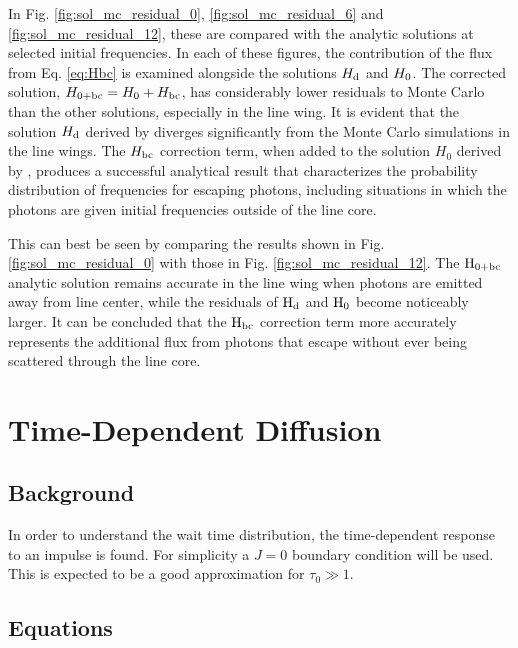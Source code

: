 \documentclass{aastex63}
\begin{document}
 In Fig. \ref{fig:sol_mc_residual_0}, \ref{fig:sol_mc_residual_6} and \ref{fig:sol_mc_residual_12}, these are compared with the analytic solutions at selected initial frequencies. In each of these figures, the contribution of the flux from Eq. \ref{eq:Hbc} is examined alongside the solutions $H_{\rm d}$ and $H_{\rm 0}$. The corrected solution, $H_{\rm 0 + bc} = H_{\rm 0} + H_{\rm bc}$, has considerably lower residuals to Monte Carlo than the other solutions, especially in the line wing. It is evident that the solution $H_{\rm d}$ derived by \citet{1973MNRAS.162...43H} diverges significantly from the Monte Carlo simulations in the line wings. The $H_{\rm bc}$ correction term, when added to the solution $H_0$ derived by \citet{2006ApJ...649...14D}, produces a successful analytical result that characterizes the probability distribution of frequencies for escaping photons, including situations in which the photons are given initial frequencies outside of the line core.

This can best be seen by comparing the results shown in Fig. \ref{fig:sol_mc_residual_0} with those in Fig. \ref{fig:sol_mc_residual_12}. The $\rm H_{0+bc}$ analytic solution remains accurate in the line wing when photons are emitted away from line center, while the residuals of $\rm H_d$ and $\rm H_0$ become noticeably larger. It can be concluded that the $\rm H_{bc}$ correction term more accurately represents the additional flux from photons that escape without ever being scattered through the line core.

\section{Time-Dependent Diffusion}
\label{sec:time_dependent}

\subsection{Background}
\label{subsec:time_dependent:background}

In order to understand the wait time distribution, the time-dependent response to an impulse is found. For simplicity a $J=0$ boundary condition will be used. This is expected to be a good approximation for $\tau_0 \gg 1$. 

\subsection{Equations}
\label{subsec:time_dependent:equations}
\end{document}
